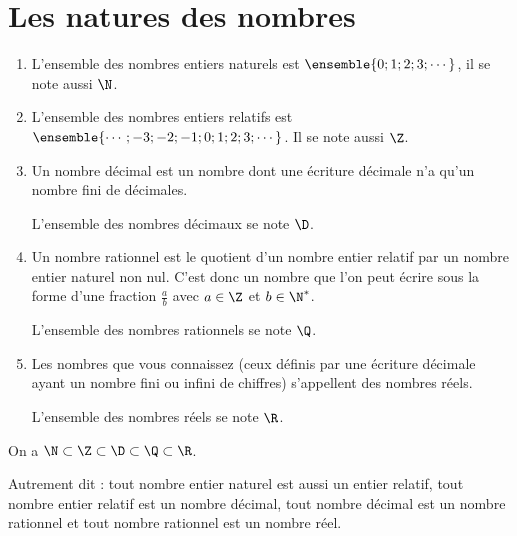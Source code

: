 %
%
%
%
                \section{Les natures des nombres}
%
    \begin{dfn}
    \begin{enumerate}
    \item L'ensemble des nombres entiers naturels est $\ensemble{0;1;2;3;\cdots}$, il se note aussi $\N$.
    \item L'ensemble des nombres entiers relatifs est $\ensemble{\cdots;-3;-2;-1;0;1;2;3;\cdots}$. Il se note aussi $\Z$.
    \item Un nombre décimal est un nombre dont une écriture décimale n'a qu'un nombre fini de décimales.
    
    L'ensemble des nombres décimaux se note $\D$.
    \item Un nombre rationnel est le quotient d'un nombre entier relatif par un nombre entier naturel non nul. C'est donc un nombre que l'on peut écrire sous la forme d'une fraction $\frac{a}{b}$ avec $a\in\Z$ et $b\in\N^*$.
    
    L'ensemble des nombres rationnels se note $\Q$.
    \item Les nombres que vous connaissez (ceux définis par une écriture décimale ayant un nombre fini ou infini de chiffres) s'appellent des nombres réels.
         
    L'ensemble des nombres réels se note $\R$. 
\end{enumerate}
    \end{dfn}
    

    \begin{prp}On a $\N\subset\Z\subset \D\subset \Q\subset \R$.

Autrement dit : tout nombre entier naturel est aussi un entier relatif, tout nombre entier relatif est un nombre décimal, tout nombre décimal est un nombre rationnel et tout nombre rationnel est un nombre réel.     
    \end{prp}

